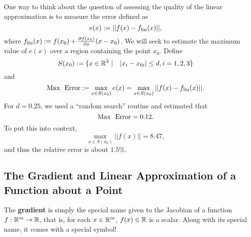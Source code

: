 One way to think about the question of assessing the quality of the linear approximation is to measure the error defined as
 $$e(x):= ||f(x)-f_{\rm lin}(x) ||,$$
 where $f_{\rm lin}(x):=f(x_0) + \frac{\partial f(x_0)}{\partial x} (x - x_0)$. We will seek to estimate the maximum value of $e(x)$ over a region containing the point $x_0$.
 Define 
 $$S(x_0):= \{x  \in \mathbb R^3 ~|~~~ |x_i-x_{0i} | \le d, i=1,2,3 \} $$
 and 
\begin{equation}
    \label{eq:MaxErrorLinApprox}
    {\rm Max~~ Error} := \max_{x\in S(x_0)} e(x) = \max_{x\in S(x_0)} ||f(x)-f_{\rm lin}(x) ||.
\end{equation}
For $d=0.25$, we used a ``random search'' routine and estimated that
$$ {\rm Max~~ Error}=0.12.$$
To put this into context, 
$$  \max_{x\in S(x_0)} ||f(x)|| = 8.47,$$
and thus the relative error is about $1.5\%.$
 \Qed
 
 \subsection{The Gradient and Linear Approximation of a Function about a Point}
 
 The \textbf{gradient} is simply the special name given to the Jacobian of a function $f:\mathbb R^m \to \mathbb R$, that is, for each $x \in \mathbb R^m$, $f(x)\in \mathbb R$ is a scalar. Along with its special name, it comes with a special symbol!
 
